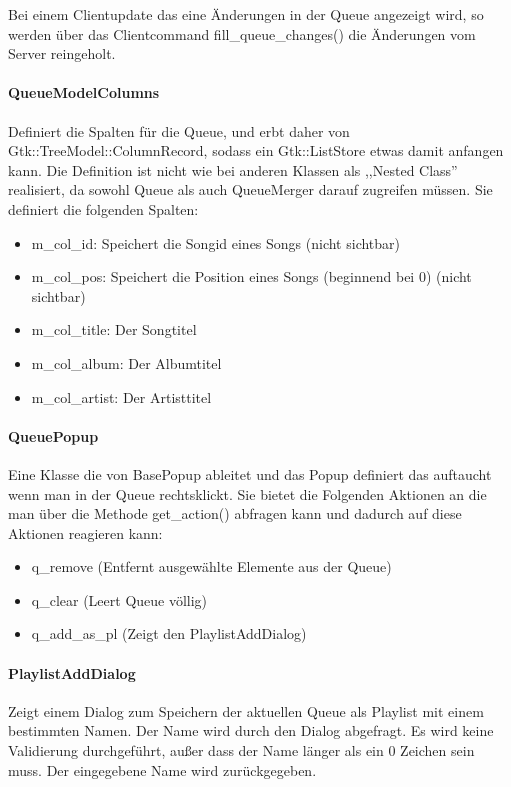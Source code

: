 Bei einem Clientupdate das eine Änderungen in der Queue angezeigt wird, so werden über das Clientcommand fill\_queue\_changes() die Änderungen vom Server reingeholt.

\paragraph{QueueModelColumns}
Definiert die Spalten für die Queue, und erbt daher von Gtk::TreeModel::ColumnRecord, sodass ein Gtk::ListStore etwas damit anfangen kann.
Die Definition ist nicht wie bei anderen Klassen als ,,Nested Class'' realisiert, da sowohl Queue als auch QueueMerger darauf zugreifen müssen. 
Sie definiert die folgenden Spalten:
\begin{itemize}
\item m\_col\_id: Speichert die Songid eines Songs (nicht sichtbar)
\item m\_col\_pos: Speichert die Position eines Songs (beginnend bei 0) (nicht sichtbar)
\item m\_col\_title: Der Songtitel
\item m\_col\_album: Der Albumtitel
\item m\_col\_artist: Der Artisttitel
\end{itemize}

\paragraph{QueuePopup}
Eine Klasse die von BasePopup ableitet und das Popup definiert das auftaucht wenn man in der Queue rechtsklickt.
Sie bietet die Folgenden Aktionen an die man über die Methode get\_action() abfragen kann und dadurch auf diese Aktionen reagieren kann:
\begin{itemize}
\item q\_remove (Entfernt ausgewählte Elemente aus der Queue)
\item q\_clear (Leert Queue völlig)
\item q\_add\_as\_pl (Zeigt den PlaylistAddDialog)
\end{itemize}

\paragraph{PlaylistAddDialog}
Zeigt einem Dialog zum Speichern der aktuellen Queue als Playlist mit einem bestimmten Namen. Der Name wird durch den Dialog abgefragt.
Es wird keine Validierung durchgeführt, außer dass der Name länger als ein 0 Zeichen sein muss. Der eingegebene Name wird zurückgegeben.


